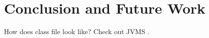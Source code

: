 \section{Conclusion and Future Work}

How does class file look like? Check out JVMS \cite{lindhold12}.